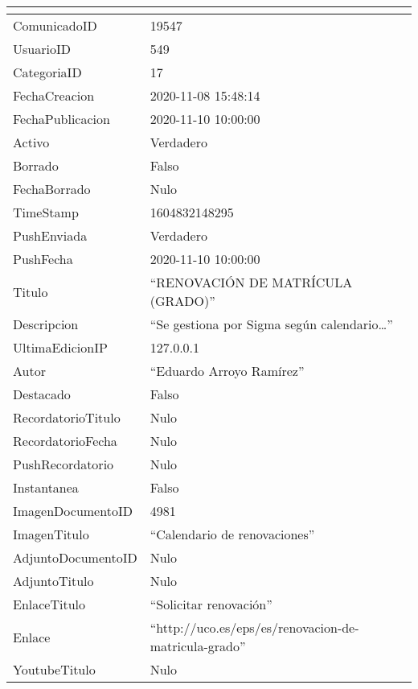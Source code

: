 \begin{table}[h!]
    \centering
    \begin{tabular}{|ll|}
        \hline
        \rowcolor[HTML]{9B9B9B} 
        \multicolumn{1}{|c}{\cellcolor[HTML]{9B9B9B}{\color[HTML]{FFFFFF} Atributo}} & \multicolumn{1}{c|}{\cellcolor[HTML]{9B9B9B}{\color[HTML]{FFFFFF} Valor}} \\ \hline
        ComunicadoID & 19547 \\
        UsuarioID & 549 \\
        CategoriaID & 17 \\
        FechaCreacion & 2020-11-08 15:48:14 \\
        FechaPublicacion & 2020-11-10 10:00:00 \\
        Activo & Verdadero \\
        Borrado & Falso \\
        FechaBorrado & Nulo \\
        TimeStamp & 1604832148295 \\
        PushEnviada & Verdadero \\
        PushFecha & 2020-11-10 10:00:00 \\
        Titulo & ``RENOVACIÓN DE MATRÍCULA (GRADO)'' \\
        Descripcion & ``Se gestiona por Sigma según calendario\dots'' \\
        UltimaEdicionIP & 127.0.0.1 \\
        Autor & ``Eduardo Arroyo Ramírez'' \\
        Destacado & Falso \\
        RecordatorioTitulo & Nulo \\
        RecordatorioFecha & Nulo \\
        PushRecordatorio & Nulo \\
        Instantanea & Falso \\
        ImagenDocumentoID & 4981 \\
        ImagenTitulo & ``Calendario de renovaciones'' \\
        AdjuntoDocumentoID & Nulo \\
        AdjuntoTitulo & Nulo \\
        EnlaceTitulo & ``Solicitar renovación'' \\
        Enlace & ``http://uco.es/eps/es/renovacion-de-matricula-grado'' \\
        YoutubeTitulo & Nulo \\

\end{tabular}
\end{table}
